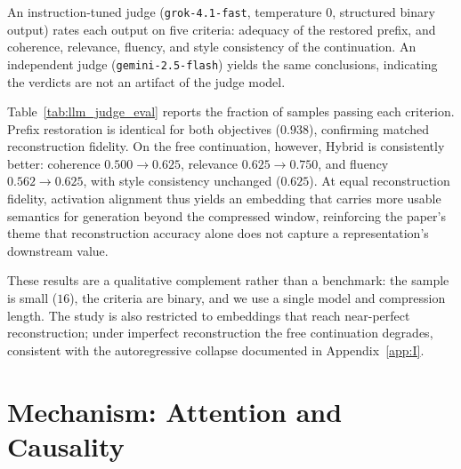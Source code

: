 An instruction-tuned judge (\texttt{grok-4.1-fast}, temperature $0$, structured binary output) rates each output on five criteria: adequacy of the restored prefix, and coherence, relevance, fluency, and style consistency of the continuation. An independent judge (\texttt{gemini-2.5-flash}) yields the same conclusions, indicating the verdicts are not an artifact of the judge model.

Table~\ref{tab:llm_judge_eval} reports the fraction of samples passing each criterion. Prefix restoration is identical for both objectives ($0.938$), confirming matched reconstruction fidelity. On the free continuation, however, Hybrid is consistently better: coherence $0.500 \to 0.625$, relevance $0.625 \to 0.750$, and fluency $0.562 \to 0.625$, with style consistency unchanged ($0.625$). At equal reconstruction fidelity, activation alignment thus yields an embedding that carries more usable semantics for generation beyond the compressed window, reinforcing the paper's theme that reconstruction accuracy alone does not capture a representation's downstream value.

\begin{table}[t]
    \centering
    \caption{LLM-as-judge evaluation of free continuations generated from a single compression embedding (SmolLM2-1.7B, $16$ PG-19 samples, $32$-token compressed prefix, $64$-token generation). Values are the fraction of samples for which the judge (\texttt{grok-4.1-fast}) returns \texttt{True} on each binary criterion. \emph{Common}: cross-entropy reconstruction; \emph{Hybrid}: with cosine activation alignment ($\alpha=1$, $L=5$).}
    \label{tab:llm_judge_eval}
    \begin{small}
    
    \end{small}
\end{table}

These results are a qualitative complement rather than a benchmark: the sample is small ($16$), the criteria are binary, and we use a single model and compression length. The study is also restricted to embeddings that reach near-perfect reconstruction; under imperfect reconstruction the free continuation degrades, consistent with the autoregressive collapse documented in Appendix~\ref{app:I}.

\section{Mechanism: Attention and Causality}
\label{app:part_mechanism}

